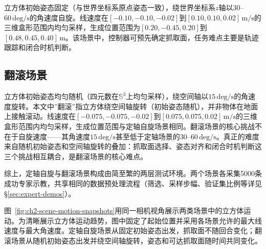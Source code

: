 立方体初始姿态固定（与世界坐标系原点姿态一致），绕世界坐标系$z$轴以$30$--$60\,\mathrm{deg/s}$的角速度自旋。线速度在$[-0.10,-0.10,-0.02]$到$[0.10,0.10,0.02]\,\mathrm{m/s}$的三维盒形范围内均匀采样，生成位置范围为$[0.20,-0.45,0.20]$到$[0.48,0.45,0.40]\,\mathrm{m}$。该场景中，控制器可预先确定抓取面，任务难点主要是轨迹跟踪和闭合时机判断。

\subsection{翻滚场景}

立方体初始姿态均匀随机（四元数在$\mathbb{S}^3$上均匀采样），绕空间轴以$15\,\mathrm{deg/s}$的角速度旋转。本文中”翻滚”指立方体绕空间轴旋转（初始姿态随机），并非物体在地面上接触滚动。线速度在$[-0.075,-0.075,-0.02]$到$[0.075,0.075,0.02]\,\mathrm{m/s}$的三维盒形范围内均匀采样，生成位置范围与定轴自旋场景相同。翻滚场景的核心挑战不在于自旋速度——其角速度$15\,\mathrm{deg/s}$甚至低于定轴场景的$30$--$60\,\mathrm{deg/s}$。真正的难度来自随机初始姿态和空间轴旋转的叠加：抓取面选择、姿态对齐和闭合时机判断这三个挑战相互耦合，是翻滚场景的核心难点。

综上，定轴自旋与翻滚场景构成由简至繁的两层测试环境。两个场景各采集5000条成功专家示教，共享相同的数据预处理流程（筛选、采样步幅、验证集比例等详见\S\ref{sec:expert-demos}）。

图~\ref{fig:ch2-scene-motion-snapshots}用同一相机视角展示两类场景中的立方体运动。为清晰展示立方体运动趋势，图中固定了起始位置并采用各场景允许的最大线速度与最大角速度。定轴自旋场景从固定初始姿态出发，抓取面不随回合变化；翻滚场景从随机初始姿态出发并绕空间轴旋转，姿态和可达抓取面随时间共同变化。

